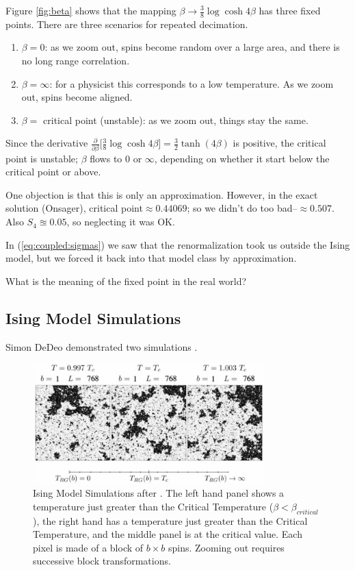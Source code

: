 \documentclass[]{article}
\begin{document}
Figure \ref{fig:beta} shows that the mapping $\beta\rightarrow\frac{3}{8} \log{\cosh{4\beta} }$ has three fixed points. There are three scenarios for repeated decimation.
\begin{enumerate}
	\item $\beta=0$: as we zoom out, spins become random over a large area, and there is no long range correlation.
	\item  $\beta=\infty$: for a physicist this corresponds to a low temperature. As we zoom out, spins become aligned.
	\item  $\beta=$ critical point (unstable): as we zoom out, things stay the same.
\end{enumerate}

Since the derivative  $\frac{\partial}{\partial \beta}\big[\frac{3}{8} \log{\cosh{4\beta}}\big]=\frac{3}{2} \tanh(4\beta)$ is positive, the critical point is unstable; $\beta$ flows to $0$ or $\infty$, depending on whether it start below the critical point or above.

One objection is that this is only an approximation. However, in the exact solution (Onsager), critical point$\approx0.44069$; so we didn't do too bad--$\approx0.507$. Also $S_4\approxeq0.05$, so neglecting it was OK.

In (\ref{eq:coupled:sigmas}) we saw that the renormalization took us outside the Ising model, but we forced it back into that model class by approximation.

What is the meaning of the fixed point in the real world?

\subsection{Ising Model Simulations}

Simon DeDeo demonstrated two simulations \cite{nottelmann2000ising,ashton2012renormalization}.

\begin{figure}[H]
	\begin{center}
		\caption[Ising Model Simulations after \cite{ashton2012renormalization}]{Ising Model Simulations after \cite{ashton2012renormalization}. The left hand panel shows a temperature just greater than the Critical Temperature ($\beta<\beta_{critical}$), the right hand has a temperature just greater than the Critical Temperature, and the middle panel is at the critical value. Each pixel is made of a block of $b\times b$ spins. Zooming out requires successive block transformations.}\label{fig:douglas:ashton}
		\includegraphics[width=0.8\textwidth]{DouglasAshton1}
	\end{center}
\end{figure}
\end{document}
